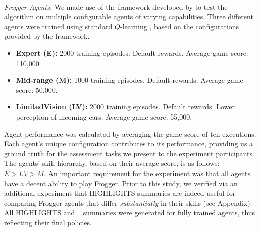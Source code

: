 \begin{figure}[t]
	\centering
    \\
	\caption{}
	\label{fig: domains}
\end{figure}

\emph{Frogger Agents.} We made use of the framework developed by
\citet{Sequeira2020} to test the \disalg~ algorithm on multiple configurable
agents of varying capabilities. Three different agents were trained using standard $Q$-learning \cite{watkins1992q}, based on the configurations provided by the framework. 
\begin{itemize}
	\item \textbf{Expert (E):} 2000 training episodes. Default rewards. Average
	game score: 110,000.
	\item \textbf{Mid-range (M):} 1000 training episodes. Default rewards.
	Average game score: 50,000.
	\item \textbf{LimitedVision (LV):} 2000 training episodes. Default rewards.
	Lower perception of incoming cars. Average game score: 55,000.
\end{itemize}
Agent performance was calculated by averaging the game score of ten
executions. Each agent's unique configuration contributes to its performance,
providing us a ground truth for the assessment tasks we present to the
experiment participants. The agents' skill hierarchy, based on their average
score, is as follows: $E>LV>M$. An important requirement for the
experiment was that all agents have a decent ability to play Frogger.
Prior to this study, we verified via an additional experiment that HIGHLIGHTS summaries are indeed useful for comparing Frogger agents that differ \emph{substantially} in their skills (see Appendix).
All HIGHLIGHTS and \disalg~ summaries were generated for fully trained agents, thus
reflecting their final policies. 


